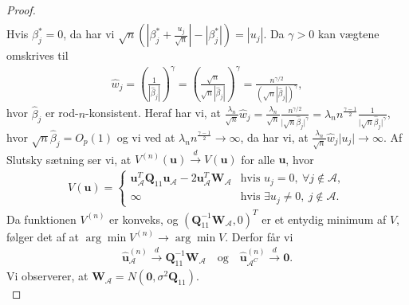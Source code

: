 \begin{proof}
\begin{align*}
\end{align*}
Hvis $\beta_j^{*} = 0$, da har vi $\sqrt{n} \left( \left\vert \beta_j^{*} +\frac{u_j}{\sqrt{n}} \right\vert - \left\vert \beta_j^{*} \right\vert \right) = \left\vert u_j \right\vert$.
Da $\gamma >0$ kan vægtene omskrives til 
\begin{align*}
\hat{w}_j= \left( \frac{1}{\left\vert \hat{\beta}_j \right\vert} \right)^\gamma=\left( \frac{\sqrt{n}}{\sqrt{n} \left\vert \hat{\beta}_j \right\vert} \right)^\gamma = \frac{n^{\gamma/2}}{ \left( \sqrt{n} \left\vert \hat{\beta}_j \right\vert \right)^\gamma},
\end{align*} 
hvor $\hat{\beta}_j$ er rod-$n$-konsistent. Heraf har vi, at $\frac{\lambda_n}{\sqrt{n}} \hat{w}_j = \frac{\lambda_n}{\sqrt{n}} \frac{n^{\gamma/2}}{\vert \sqrt{n} \hat{\beta}_j \vert^\gamma} = \lambda_n n^{\frac{\gamma -1}{2}} \frac{1}{\vert \sqrt{n} \hat{\beta}_j \vert^\gamma} $, hvor $\sqrt{n} \hat{\beta}_j = O_p(1)$ og vi ved at  $\lambda_n n^\frac{\gamma-1}{2} \rightarrow \infty$, da har vi, at $\frac{\lambda_n}{\sqrt{n}} \hat{w}_j  \vert u_j \vert \rightarrow \infty$.
Af Slutsky sætning ser vi, at $V^{(n)} (\mathbf{u}) \overset{d}{\rightarrow} V(\textbf{u})$ for alle $\mathbf{u}$, hvor
\begin{align*}
V(\textbf{u}) = \begin{cases}
    \mathbf{u}_\mathcal{A}^T \mathbf{Q}_{11} \mathbf{u}_\mathcal{A}-2\mathbf{u}^T_\mathcal{A} \mathbf{W}_\mathcal{A} & \text{hvis  $u_j=0, \ \forall j \notin \mathcal{A} $},\\
    \infty & \text{hvis } \exists u_j \neq 0, \ j \notin \mathcal{A} .
  \end{cases}
\end{align*}
Da funktionen $V^{(n)}$ er konveks, og $(\mathbf{Q}_{11}^{-1} \mathbf{W_\mathcal{A}},0)^T$ er et entydig minimum af $V$, følger det af \cite{Zou} at 
$\arg\min V^{(n)} \rightarrow \arg\min V$.
Derfor får vi
\begin{align}
\hat{\mathbf{u}}_\mathcal{A}^{(n)} \overset{d}{\rightarrow} \mathbf{Q}_{11}^{-1} \mathbf{W}_\mathcal{A} \quad \text{og} \quad \hat{\mathbf{u}}_{\mathcal{A}^C}^{(n)} \overset{d}{\rightarrow} \mathbf{0}. \label{eq:minUA}
\end{align}
Vi observerer, at $\mathbf{W}_\mathcal{A}=N(\mathbf{0}, \sigma^2 \mathbf{Q}_{11})$. \\


\end{proof}
